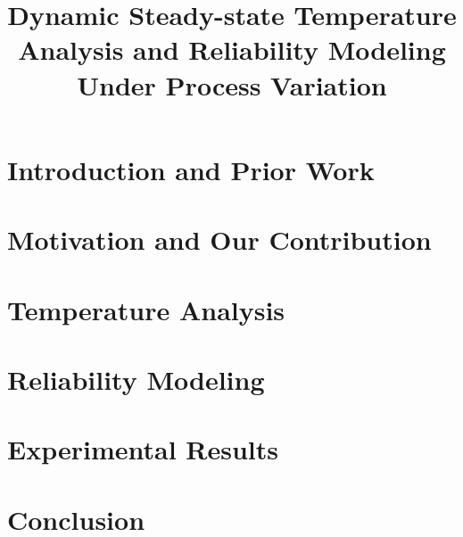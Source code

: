 \documentclass[conference]{IEEEtran}
\begin{document}
  \title{Dynamic Steady-state Temperature Analysis and Reliability Modeling Under Process Variation}

  \author{}

  \maketitle

  \begin{abstract}
    
  \end{abstract}

  \section{Introduction and Prior Work} 
  

  \section{Motivation and Our Contribution}

  \section{Temperature Analysis}
  

  \section{Reliability Modeling}

  \section{Experimental Results}

  \section{Conclusion} 
  

  \printbibliography
\end{document}
